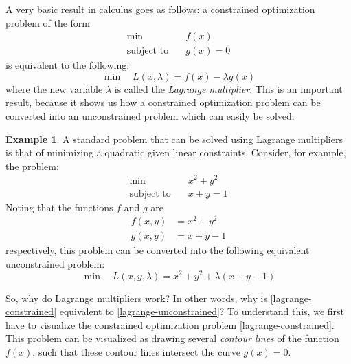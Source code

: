 \documentclass[a4paper]{article}
\theoremstyle{definition}
\newtheorem{example}{Example}[subsection]
\begin{document}
A very basic result in calculus goes as follows: a constrained optimization problem of the form
\begin{equation}
	\label{lagrange-constrained}
	\begin{aligned}
		\min \quad & f(x) \\
		\text{subject to} \quad & g(x) = 0
	\end{aligned}
\end{equation}
is equivalent to the following:
\begin{equation}
	\label{lagrange-unconstrained}
	\min \quad L(x, \lambda) = f(x) - \lambda g(x)
\end{equation}
where the new variable $\lambda$ is called the \textit{Lagrange multiplier}.
This is an important result, because it shows us how a constrained optimization problem can be converted into an unconstrained problem which can easily be solved.

\begin{example}
	A standard problem that can be solved using Lagrange multipliers is that of minimizing a quadratic given linear constraints.
	Consider, for example, the problem:
	\begin{equation*}
		\begin{aligned}
			\min \quad & x^2 + y^2 \\
			\text{subject to} \quad & x + y = 1
		\end{aligned}
	\end{equation*}
	Noting that the functions $f$ and $g$ are
	\begin{align*}
		f(x, y) & = x^2 + y^2 \\
		g(x, y) & = x + y - 1
	\end{align*}
	respectively, this problem can be converted into the following equivalent unconstrained problem:
	\begin{equation*}
		\min \quad L(x, y, \lambda) = x^2 + y^2 + \lambda(x + y - 1)
	\end{equation*}
\end{example}

So, why do Lagrange multipliers work?
In other words, why is \eqref{lagrange-constrained} equivalent to \eqref{lagrange-unconstrained}?
To understand this, we first have to visualize the constrained optimization problem \eqref{lagrange-constrained}.
This problem can be visualized as drawing several \textit{contour lines} of the function $f(x)$, such that these contour lines intersect the curve $g(x) = 0$.
\end{document}

